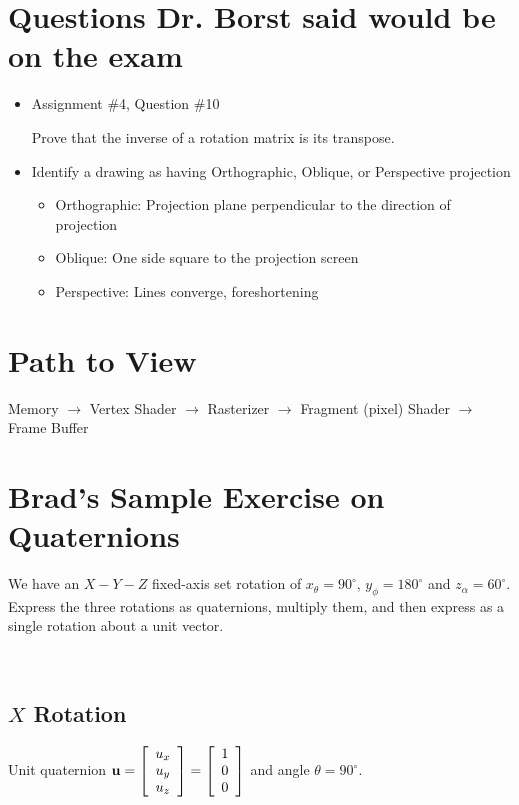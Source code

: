 \documentclass[11pt]{article}
\begin{document}
\begin{spacing}{1.2}
\section{Questions Dr. Borst said would be on the exam}

\begin{itemize}
	\item Assignment \#4, Question \#10

	Prove that the inverse of a rotation matrix is its transpose.  
	\item Identify a drawing as having Orthographic, Oblique, or Perspective projection		\begin{itemize}
		\item Orthographic:  Projection plane perpendicular to the direction of projection
		\item Oblique:  One side square to the projection screen
		\item Perspective:  Lines converge, foreshortening
	\end{itemize}
\end{itemize}


\section{Path to View}

Memory $\to$ Vertex Shader $\to$ Rasterizer $\to$ Fragment (pixel) Shader $\to$ Frame Buffer

\section{Brad's Sample Exercise on Quaternions}

We have an $X-Y-Z$ fixed-axis set rotation of $x_{\theta} = 90^{\circ}$, $y_{\phi} = 180^{\circ}$ and $z_{\alpha} = 60^{\circ}$.  Express the three rotations as quaternions, multiply them, and then express as a single rotation about a unit vector.

\

\subsection{$X$ Rotation}

Unit quaternion 
$\displaystyle 
\mathbf{u} = 
\left[
	\begin{array}{c}
		u_x \cr u_y \cr u_z \cr
	\end{array}
\right]
= 
\left[
	\begin{array}{c}
		1 \cr 0 \cr 0 \cr
	\end{array}
\right]
$
and angle $\theta = 90^{\circ}$.


\end{spacing}
\end{document}
